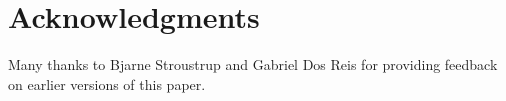 \section*{Acknowledgments}

Many thanks to Bjarne Stroustrup and Gabriel Dos Reis for providing feedback on earlier versions of this paper.
